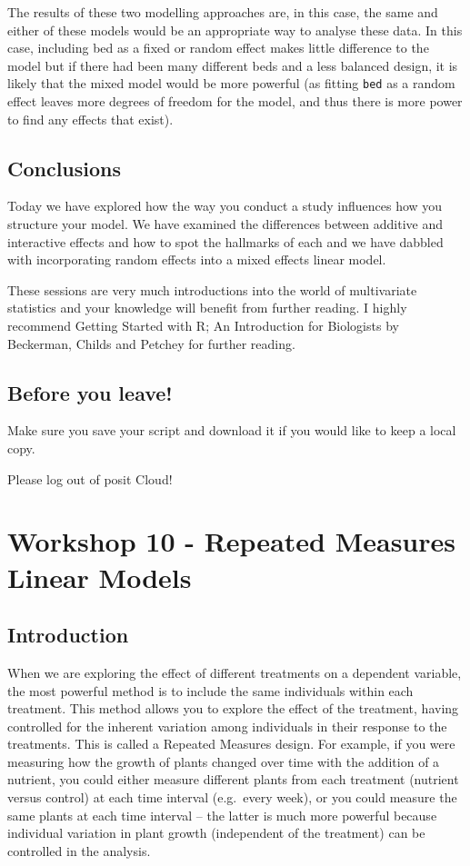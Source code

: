 \documentclass[
]{book}
\begin{document}
The results of these two modelling approaches are, in this case, the same and either of these models would be an appropriate way to analyse these data. In this case, including bed as a fixed or random effect makes little difference to the model but if there had been many different beds and a less balanced design, it is likely that the mixed model would be more powerful (as fitting \texttt{bed} as a random effect leaves more degrees of freedom for the model, and thus there is more power to find any effects that exist).

\section{Conclusions}\label{conclusions}

Today we have explored how the way you conduct a study influences how you structure your model. We have examined the differences between additive and interactive effects and how to spot the hallmarks of each and we have dabbled with incorporating random effects into a mixed effects linear model.

These sessions are very much introductions into the world of multivariate statistics and your knowledge will benefit from further reading. I highly recommend Getting Started with R; An Introduction for Biologists by Beckerman, Childs and Petchey for further reading.

\section{Before you leave!}\label{before-you-leave-8}

Make sure you save your script and download it if you would like to keep a local copy.

Please log out of posit Cloud!

\chapter{Workshop 10 - Repeated Measures Linear Models}\label{workshop-10---repeated-measures-linear-models}

\section{Introduction}\label{introduction-8}

When we are exploring the effect of different treatments on a dependent variable, the most powerful method is to include the same individuals within each treatment. This method allows you to explore the effect of the treatment, having controlled for the inherent variation among individuals in their response to the treatments. This is called a Repeated Measures design. For example, if you were measuring how the growth of plants changed over time with the addition of a nutrient, you could either measure different plants from each treatment (nutrient versus control) at each time interval (e.g.~every week), or you could measure the same plants at each time interval -- the latter is much more powerful because individual variation in plant growth (independent of the treatment) can be controlled in the analysis.
\end{document}
